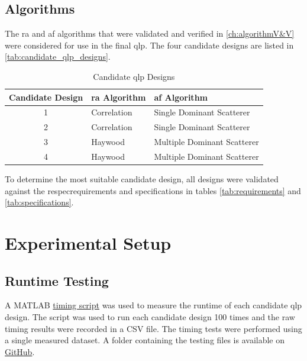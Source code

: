 \documentclass[class=report,11pt,crop=false]{standalone}
\begin{document}
    \subsection{Algorithms}
    The \gls{ra} and \gls{af} algorithms that were validated and verified in \autoref{ch:algorithmV&V} were considered for use in the final \gls{qlp}. The four candidate designs are listed in \autoref{tab:candidate_qlp_designs}. 
        \begin{table}[H]
            \centering
            \begin{tabular}{|c|l|l|}
                \hline
                \textbf{Candidate Design} & \textbf{\gls{ra} Algorithm} & \textbf{\gls{af} Algorithm}\\
                \hline
                 1  &  Correlation    & Single Dominant Scatterer\\
                 \hline
                 2  &  Correlation    & Single Dominant Scatterer\\
                 \hline
                 3  &  Haywood        & Multiple Dominant Scatterer\\
                 \hline
                 4  &  Haywood        & Multiple Dominant Scatterer\\
                 \hline
            \end{tabular}
            \caption{Candidate \gls{qlp} Designs}
            \label{tab:candidate_qlp_designs}
        \end{table}

    To determine the most suitable candidate design, all designs were validated against the respecrequirements and specifications in tables \autoref{tab:requirements} and \autoref{tab:specifications}.
    
\section{Experimental Setup}

    \subsection{Runtime Testing}
    A \textsc{MATLAB} \href{}{timing script} was used to measure the runtime of each candidate \gls{qlp} design. The script was used to run each candidate design 100 times and the raw timing results were recorded in a CSV file. The timing tests were performed using a single measured dataset. A folder containing the testing files is available on \href{}{GitHub}.
\end{document}
